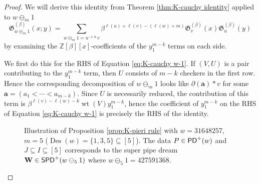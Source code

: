 \documentclass[11pt,reqno]{amsart} %
\makeatletter
\newcommand{\bbZ}{\mathbb{Z}}
\newcommand{\frakG}{\mathfrak{G}}
\newcommand{\bfa}{\mathbf{a}}
\newcommand{\bfW}{\mathbf{W}}
\newcommand{\sseq}{\subseteq}
\DeclareMathOperator{\Des}{Des}
\DeclareMathOperator{\wt}{wt}
\DeclareMathOperator{\PD}{\sf{PD}}
\DeclareMathOperator{\SPD}{\sf{SPD}}
\newenvironment{shift}[1][(0,0)]{
    \begin{scope}[shift={#1}]
}{
    \end{scope}
}
\theoremstyle{definition}
\newcommand{\drawSquare}[3][black,opacity=0.5]{
    \draw[#1,thin]
    (#2-0.5,#3+0.5) rectangle (#2+0.5,#3-0.5);
}
\newcommand{\drawGraySquare}[3][gray,opacity=0.3]{
    \filldraw[#1,thin]
    (#2-0.5,#3+0.5) rectangle (#2+0.5,#3-0.5);
}
\newcommand{\checkerradius}{0.38}
\newcommand{\drawXChecker}[2]{
    \fill[color=x color 2] (#1,#2) circle (\checkerradius);
    \fill[
        color=x color 1,
        pattern color=x color 1,
        pattern={Lines[distance=2pt]},
        thick
    ] (#1,#2) circle (\checkerradius);
    \draw[color=x color 1,thick] (#1,#2) circle (\checkerradius);
}
\newcommand{\drawYChecker}[2]{
    \fill[color=y color 2] (#1,#2) circle (\checkerradius);
    \fill[
        color=y color 1,
        pattern color=y color 1,
        pattern={Lines[distance=1.5pt,angle=90]},
    ] (#1,#2) circle (\checkerradius);
    \draw[color=y color 1, thick] (#1,#2) circle (\checkerradius);
}
\newcommand{\drawXYChecker}[2]{
    \drawXChecker{#1}{#2}
    \drawYChecker{#1-0.1}{#2+0.1}
}
\newcommand{\drawRCGraphTile}[3]{

    \ifnum #3=0 \fi %
    \ifnum #3=1 \drawXChecker{#1}{#2} \fi
    \ifnum #3=2 \drawYChecker{#1}{#2} \fi
    \ifnum #3=3 \drawXYChecker{#1}{#2} \fi
    \ifnum #3=4 \drawGraySquare{#1}{#2}\drawXChecker{#1}{#2} \fi
    \ifnum #3=5 \drawGraySquare{#1}{#2}\drawYChecker{#1}{#2} \fi
    \ifnum #3=6 \fi
    \ifnum #3=7 \fi
    \ifnum #3=8 \fi
    \ifnum #3=9 \drawGraySquare{#1}{#2} \fi
}
\newcommand{\drawRCGraph}[3]{
    \PD@i = 1
    \PD@j = 1
    \foreach \t in {#3}{
        \drawRCGraphTile{\number\PD@j}{-\number\PD@i}{\t}
        \drawSquare{\number\PD@j}{-\number\PD@i}
        
        \ifnum\PD@j < \numexpr#2\relax
            \global\advance\PD@j by 1
        \else
            \global\PD@j = 1
            \global\advance\PD@i by 1
        \fi
    }
}
\makeatother
\begin{document}
\begin{proof}
We will derive this identity from Theorem \ref{thm:K-cauchy identity} applied to $w\ominus_m 1$
\begin{equation}
\label{eq:K-cauchy w-1}
    \frakG_{w\ominus_m 1}^{(\beta)}(x;y) = \sum_{
        w\ominus_m 1 = u^{-1}*v
    } \beta^{\ell(u)+\ell(v)-(\ell(w)+m)} \frakG_v^{(\beta)}(x) \frakG_u^{(\beta)}(y)
\end{equation}
by examining the $\bbZ[\beta][x]$-coefficients of the $y_1^{m-k}$ terms on each side.

We first do this for the RHS of Equation \ref{eq:K-cauchy w-1}.
If $(V,U)$ is a pair contributing to the $y_1^{m-k}$ term, then $U$ consists of $m-k$ checkers in the first row.
Hence the corresponding decomposition of $w\ominus_m 1$ looks like $\partial(\bfa)*v$ for some $\bfa = (a_1<\cdots<a_{m-k})$.
Since $U$ is necessarily reduced, the contribution of this term is $\beta^{\ell(v)-\ell(w)-k}\wt(V)y_1^{m-k}$, hence the coefficient of $y_1^{m-k}$ on the RHS of Equation \ref{eq:K-cauchy w-1} is precisely the RHS of the identity.

\begin{figure}
\caption{
    Illustration of Proposition \ref{prop:K-pieri rule} with $w = 31648257$, $m = 5$ ($\Des(w) = \{1,3,5\}\sseq [5]$).
    The data $P\in \PD^+(w)$ and $J\sseq I\sseq [5]$ corresponds to the super pipe dream $\bfW\in \SPD^+(w\ominus_5 1)$ where $w\ominus_5 1 = 427591368$.
}
\label{fig:pieri construction}
\end{figure}


\end{proof}
\end{document}
